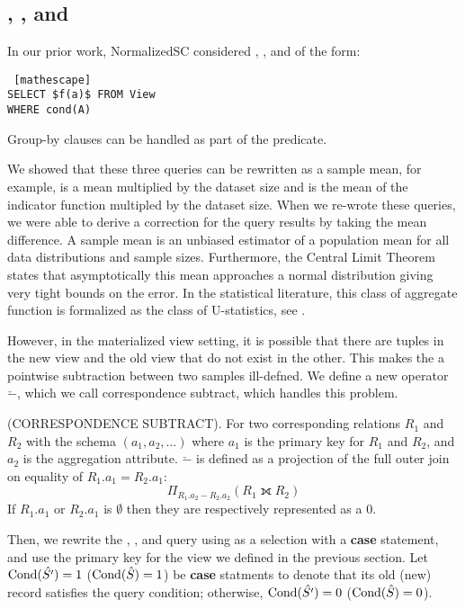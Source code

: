 \subsection{\sumfunc, \countfunc, and \avgfunc}
In our prior work, NormalizedSC considered \sumfunc, \countfunc, and \avgfunc of the form:
\begin{lstlisting} [mathescape]
SELECT $f(a)$ FROM View 
WHERE cond(A)
\end{lstlisting}
Group-by clauses can be handled as part of the predicate.

We showed that these three queries can be rewritten as a sample mean, for example, \sumfunc is a mean multiplied by the dataset size and \countfunc is the mean of the indicator function multipled by the dataset size.
When we re-wrote these queries, we were able to derive a correction for the query results by taking the mean difference.
A sample mean is an unbiased estimator of a population mean for all data distributions and sample sizes.
Furthermore, the Central Limit Theorem states that asymptotically this mean approaches a normal distribution giving very tight bounds on the error.
In the statistical literature, this class of aggregate function is formalized as the class of U-statistics, see \cite{hoeffding1948class}.

However, in the materialized view setting, it is possible that there are tuples in the new view and the old view that do not exist in the other.
This makes the a pointwise subtraction between two samples ill-defned.
We define a new operator $\check{-}$, which we call correspondence subtract, which handles this problem.
\begin{definition} (CORRESPONDENCE SUBTRACT). For two corresponding relations $R_1$ and $R_2$ with the schema $(a_1, a_2, ...)$ where 
$a_1$ is the primary key for $R_1$ and $R_2$, and $a_2$ is the aggregation attribute. 
$\check{-}$ is defined as a projection of the full outer join on equality of $R_1.a_1 = R_2.a_1$: \[ \Pi_{R_1.a_2 - R_2.a_2} ( R_1 \fullouterjoin R_2 ) \]
If $R_1.a_1$ or $R_2.a_1$ is $\emptyset$ then they are respectively represented as a $0$.
\end{definition}

Then, we rewrite the \sumfunc, \countfunc, and \avgfunc query using as a selection with a \textbf{case} statement, and use the primary key for the view we defined in the previous section.
Let $\textrm{Cond}(\hat{S'})=1$ ($\textrm{Cond}(\hat{S})=1$) be \textbf{case} statments to denote that its old (new) record satisfies the query condition; otherwise, $\textrm{Cond}(\hat{S'})=0$ ($\textrm{Cond}(\hat{S})=0$). 

